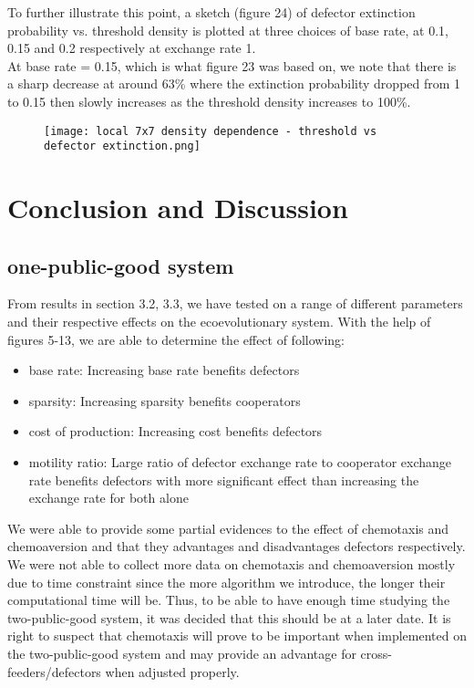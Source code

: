 \documentclass[11pt]{article}
\begin{document}
\noindent To further illustrate this point, a sketch (figure 24) of defector extinction probability vs. threshold density is plotted at three choices of base rate, at 0.1, 0.15 and 0.2 respectively at exchange rate 1.\\
At base rate = 0.15, which is what figure 23 was based on, we note that there is a sharp decrease at around 63\% where the extinction probability dropped from 1 to 0.15 then slowly increases as the threshold density increases to 100\%. 
\begin{figure}
    \centering
    \texttt{[image: local 7x7 density dependence - threshold vs defector extinction.png]}
    \caption{}
\end{figure}


\section{Conclusion and Discussion}
\subsection{one-public-good system}
From results in section 3.2, 3.3, we have tested on a range of different parameters and their respective effects on the ecoevolutionary system. With the help of figures 5-13, we are able to determine the effect of following:
\begin{itemize}
    \item base rate: Increasing base rate benefits defectors
    \item sparsity: Increasing sparsity benefits cooperators
    \item cost of production: Increasing cost benefits defectors
    \item motility ratio: Large ratio of defector exchange rate to cooperator exchange rate benefits defectors with more significant effect than increasing the exchange rate for both alone
\end{itemize}
We were able to provide some partial evidences to the effect of chemotaxis and chemoaversion and that they advantages and disadvantages defectors respectively.\\
We were not able to collect more data on chemotaxis and chemoaversion mostly due to time constraint since the more algorithm we introduce, the longer their computational time will be. Thus, to be able to have enough time studying the two-public-good system, it was decided that this should be at a later date. It is right to suspect that chemotaxis will prove to be important when implemented on the two-public-good system and may provide an advantage for cross-feeders/defectors when adjusted properly.
\end{document}
